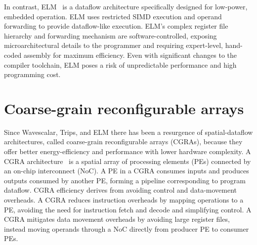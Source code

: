 In contrast, ELM~\cite{balfour2008energy} is a dataflow architecture specifically designed for low-power, embedded operation. 
% 
ELM uses
restricted SIMD execution and operand forwarding to provide
dataflow-like execution.
% 
ELM's complex register file hierarchy and forwarding
mechanism are software-controlled, exposing microarchitectural details to the
programmer and requiring expert-level, hand-coded assembly for maximum
efficiency.
% 
Even with significant changes to the compiler toolchain, ELM poses
a risk of unpredictable performance and high programming cost. 

\section{Coarse-grain reconfigurable arrays}
Since Wavescalar, Trips, and ELM there has been a resurgence of spatial-dataflow architectures, called coarse-grain reconfigurable arrays (CGRAs), because they offer better energy-efficiency and performance with lower hardware complexity.
% 
% 
A CGRA architecture~\cite{remarc,adres,matrix,dyser,revamp,opencgra,cgrame,wave,nguyen2021fifer,morphosys,mozart,ppa,fpca,plasticine,dadu2019towards,parashar2013triggered,capstan,nowatzki:isca17:stream-dataflow,goldstein2000piperench,weng2020dsagen,weng2020hybrid,voitsechov2014single,mishra2006tartan,tan2018stitch,karunaratne2017hycube,voitsechov2018inter,evx} is a spatial array of
processing elements (PEs) connected by an on-chip interconnect (NoC).
%
A PE in a CGRA consumes inputs and produces outputs 
consumed by another PE, forming a pipeline corresponding to 
program dataflow.
%
CGRA efficiency derives from avoiding control and data-movement overheads.
%
A CGRA reduces instruction overheads by mapping operations to a PE,
avoiding the need for instruction fetch and decode and simplifying control.
%
A CGRA mitigates data movement overheads by avoiding large register
files, instead moving operands through a NoC directly from 
producer PE to consumer PEs.

